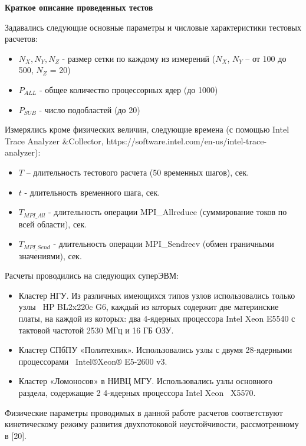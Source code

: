         \textbf{Краткое описание проведенных тестов}
        
        Задавались следующие основные параметры и числовые характеристики тестовых расчетов:
         \begin{itemize} 
        \item $N_X, N_Y, N_Z$  - размер сетки по каждому из измерений ($N_X$, $N_Y$ – от 100 до 500, $N_Z$ = 20)
        \item $P_{ALL}$  - общее количество процессорных ядер (до 1000)
        \item $P_{SUB}$  - число подобластей (до 20)
         \end{itemize} 
        Измерялись кроме физических величин, следующие времена (с помощью Intel Trace Analyzer \&Collector, https://software.intel.com/en-us/intel-trace-analyzer):
         \begin{itemize} 
        \item $T$ – длительность тестового расчета (50 временных шагов), сек.
       \item  $t$  - длительность временного шага, сек.
        \item $T_{MPI\_All}$ - длительность операции MPI\_Allreduce (суммирование токов по всей области), сек.
        \item $T_{MPI\_Send}$ - длительность операции MPI\_Sendrecv (обмен граничными значениями), сек.
        \end{itemize}
        
        
        
        Расчеты проводились на следующих суперЭВМ:
        \begin{itemize}
        \item Кластер НГУ. Из различных имеющихся типов узлов использовались только узлы  HP BL2x220c G6, каждый из которых содержит две материнские платы, на каждой из которых: два 4-ядерных процессора Intel Xeon E5540 с тактовой частотой 2530 МГц и 16 ГБ ОЗУ.
        \item Кластер СПбПУ «Политехник». Использовались узлы с двумя 28-ядерными процессорами  Intel®Xeon® E5-2600 v3.
        \item Кластер «Ломоносов» в НИВЦ МГУ. Использовались узлы основного раздела, содержащие 2 4-ядерных процессора Intel Xeon  X5570. 
        \end{itemize}
        
        Физические параметры проводимых в данной работе расчетов соответствуют кинетическому режиму развития двухпотоковой неустойчивости, рассмотренному в [20].
        
